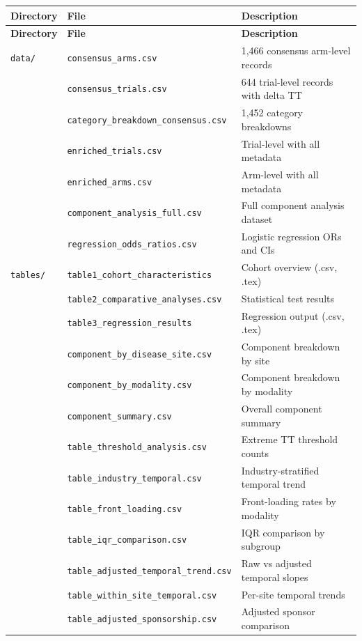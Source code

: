\documentclass[11pt,a4paper]{article}
\begin{document}
\begin{longtable}{lll}
\toprule
\textbf{Directory} & \textbf{File} & \textbf{Description} \\
\midrule
\endfirsthead
\toprule
\textbf{Directory} & \textbf{File} & \textbf{Description} \\
\midrule
\endhead
\texttt{data/} & \texttt{consensus\_arms.csv} & 1{,}466 consensus arm-level records \\
 & \texttt{consensus\_trials.csv} & 644 trial-level records with delta TT \\
 & \texttt{category\_breakdown\_consensus.csv} & 1{,}452 category breakdowns \\
 & \texttt{enriched\_trials.csv} & Trial-level with all metadata \\
 & \texttt{enriched\_arms.csv} & Arm-level with all metadata \\
 & \texttt{component\_analysis\_full.csv} & Full component analysis dataset \\
 & \texttt{regression\_odds\_ratios.csv} & Logistic regression ORs and CIs \\
\addlinespace
\texttt{tables/} & \texttt{table1\_cohort\_characteristics} & Cohort overview (.csv, .tex) \\
 & \texttt{table2\_comparative\_analyses.csv} & Statistical test results \\
 & \texttt{table3\_regression\_results} & Regression output (.csv, .tex) \\
 & \texttt{component\_by\_disease\_site.csv} & Component breakdown by site \\
 & \texttt{component\_by\_modality.csv} & Component breakdown by modality \\
 & \texttt{component\_summary.csv} & Overall component summary \\
 & \texttt{table\_threshold\_analysis.csv} & Extreme TT threshold counts \\
 & \texttt{table\_industry\_temporal.csv} & Industry-stratified temporal trend \\
 & \texttt{table\_front\_loading.csv} & Front-loading rates by modality \\
 & \texttt{table\_iqr\_comparison.csv} & IQR comparison by subgroup \\
 & \texttt{table\_adjusted\_temporal\_trend.csv} & Raw vs adjusted temporal slopes \\
 & \texttt{table\_within\_site\_temporal.csv} & Per-site temporal trends \\
 & \texttt{table\_adjusted\_sponsorship.csv} & Adjusted sponsor comparison \\

\end{longtable}
\end{document}
